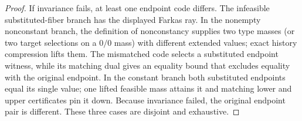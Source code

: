 \documentclass{article}
\begin{document}
\begin{proof}
If invariance fails, at least one endpoint code differs.  The infeasible substituted-fiber branch has the displayed Farkas ray.  In the nonempty nonconstant branch, the definition of nonconstancy supplies two type masses (or two target selections on a \(0/0\) mass) with different extended values; exact history compression lifts them.  The mismatched code selects a substituted endpoint witness, while its matching dual gives an equality bound that excludes equality with the original endpoint.  In the constant branch both substituted endpoints equal its single value; one lifted feasible mass attains it and matching lower and upper certificates pin it down.  Because invariance failed, the original endpoint pair is different.  These three cases are disjoint and exhaustive.
\end{proof}
\end{document}
